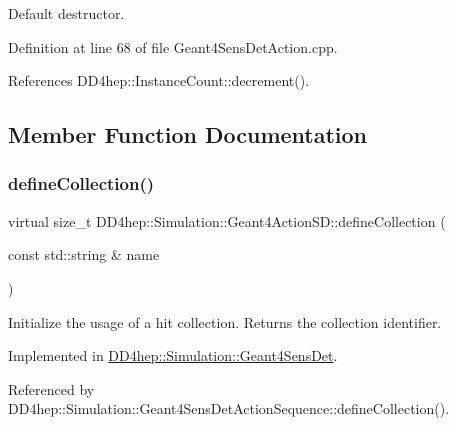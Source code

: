 Default destructor. 



Definition at line 68 of file Geant4\+Sens\+Det\+Action.\+cpp.



References D\+D4hep\+::\+Instance\+Count\+::decrement().



\subsection{Member Function Documentation}
\hypertarget{class_d_d4hep_1_1_simulation_1_1_geant4_action_s_d_acb227bd17a6f30d5df564a4d19f3f8a2}{}\label{class_d_d4hep_1_1_simulation_1_1_geant4_action_s_d_acb227bd17a6f30d5df564a4d19f3f8a2} 
\subsubsection{\texorpdfstring{define\+Collection()}{defineCollection()}}
{\footnotesize\ttfamily virtual size\+\_\+t D\+D4hep\+::\+Simulation\+::\+Geant4\+Action\+S\+D\+::define\+Collection (\begin{DoxyParamCaption}\item[{const std\+::string \&}]{name }\end{DoxyParamCaption})\hspace{0.3cm}{\ttfamily [pure virtual]}}



Initialize the usage of a hit collection. Returns the collection identifier. 



Implemented in \hyperlink{class_d_d4hep_1_1_simulation_1_1_geant4_sens_det_af75a2eab653115fffe05ccb32828a461}{D\+D4hep\+::\+Simulation\+::\+Geant4\+Sens\+Det}.



Referenced by D\+D4hep\+::\+Simulation\+::\+Geant4\+Sens\+Det\+Action\+Sequence\+::define\+Collection().

\hypertarget{class_d_d4hep_1_1_simulation_1_1_geant4_action_s_d_afaba405dfb4c663ba2403ad4558d9956}{}\label{class_d_d4hep_1_1_simulation_1_1_geant4_action_s_d_afaba405dfb4c663ba2403ad4558d9956} 
